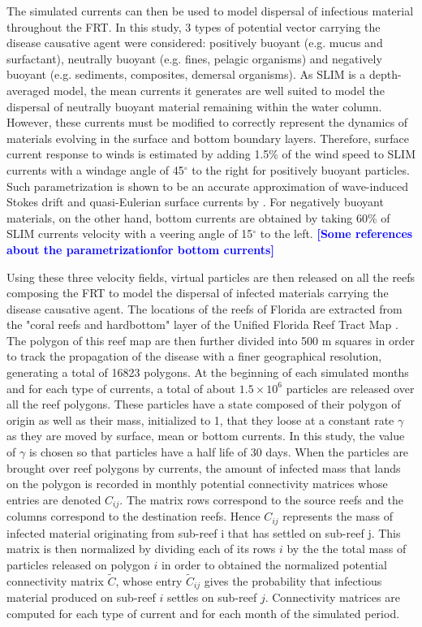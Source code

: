 \documentclass[utf8]{frontiersSCNS}
\newcommand{\lew}[1]{\textbf{\textcolor{blue}{#1}}}
\begin{document}
The simulated currents can then be used to model dispersal of infectious material throughout the FRT. In this study, 3 types of potential vector carrying the disease causative agent were considered: positively buoyant (e.g. mucus and surfactant), neutrally buoyant (e.g. fines, pelagic organisms) and negatively buoyant (e.g. sediments, composites, demersal organisms). As SLIM is a depth-averaged model, the mean currents it generates are well suited to model the dispersal of neutrally buoyant material remaining within the water column. However, these currents must be modified to correctly represent the dynamics of materials evolving in the surface and bottom boundary layers. Therefore, surface current response to winds is estimated by adding 1.5\% of the wind speed to SLIM currents with a windage angle of 45$^\circ$ to the right for positively buoyant particles. Such parametrization is shown to be an accurate approximation of wave-induced Stokes drift and quasi-Eulerian surface currents by \citep{ardhuin2009observation}. For negatively buoyant materials, on the other hand, bottom currents are obtained by taking 60\% of SLIM currents velocity with a veering angle of 15$^\circ$ to the left. \lew{[Some references about the parametrizationfor bottom currents]}

Using these three velocity fields, virtual particles are then released on all the reefs composing the FRT to model the dispersal of infected materials carrying the disease causative agent. The locations of the reefs of Florida are extracted from the "coral reefs and hardbottom" layer of the Unified Florida Reef Tract Map \citep{fwc2017unified}. The polygon of this reef map are then further divided into 500 m squares in order to track the propagation of the disease with a finer geographical resolution, generating a total of 16823 polygons. %
At the beginning of each simulated months and for each type of currents, a total of about $1.5 \times 10^6$ particles are released over all the reef polygons. These particles have a state composed of their polygon of origin as well as their mass, initialized to 1, that they loose at a constant rate $\gamma$ as they are moved by surface, mean or bottom currents. In this study, the value of $\gamma$ is chosen so that particles have a half life of 30 days. When the particles are brought over reef polygons by currents, the amount of infected mass that lands on the polygon is recorded in monthly potential connectivity matrices whose entries are denoted $C_{ij}$. The matrix rows correspond to the source reefs and the columns correspond to the destination reefs. Hence $C_{ij}$ represents the mass of infected material originating from sub-reef i that has settled on sub-reef j. This matrix is then normalized by dividing each of its rows $i$ by the the total mass of particles released on polygon $i$ in order to obtained the normalized potential connectivity matrix $\tilde{C}$, whose entry $\tilde{C}_{ij}$ gives the probability that infectious material produced on sub-reef $i$ settles on sub-reef $j$. Connectivity matrices are computed for each type of current and for each month of the simulated period.
\end{document}
